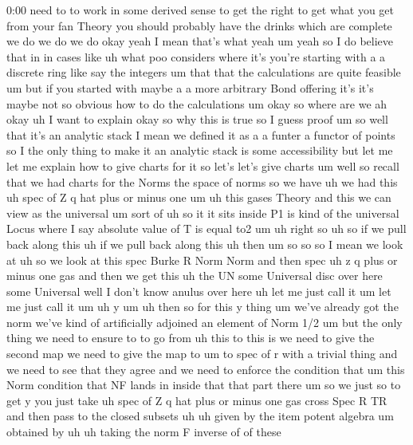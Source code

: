 \begin{unfinished}{0:00}
need  to  to  work  in  some  derived  sense  to
get  the  right  to  get  what  you  get  from
your  fan  Theory  you  should  probably  have
the  drinks  which  are  complete  we  do  we
do  we  do  okay  yeah  I  mean  that's  what
yeah  um
yeah  so  I  do  believe  that  in  in  cases
like  uh  what  poo  considers  where  it's
you're  starting  with  a  a  discrete  ring
like  say  the  integers  um  that  that  the
calculations  are  quite  feasible  um  but
if  you  started  with  maybe  a  a  more
arbitrary  Bond  offering  it's  it's  maybe
not  so  obvious  how  to  do  the
calculations  um
okay  so  where  are  we  ah
okay  uh  I  want  to  explain  okay  so  why
this  is  true  so  I  guess  proof
um  so  well  that  it's  an  analytic  stack  I
mean  we  defined  it  as  a  a  funter  a
functor  of  points  so  I  the  only  thing  to
make  it  an  analytic  stack  is  some
accessibility  but  let  me  let  me  explain
how  to  give  charts  for  it  so  let's  let's
give
charts  um  well  so  recall  that  we  had
charts  for  the  Norms  the  space  of  norms
so  we  have  uh  we  had  this  uh  spec  of  Z  q
hat  plus  or  minus  one
um  uh  this  gases
Theory  and  this  we  can  view  as  the
universal  um  sort  of
uh  so  it  it  sits  inside  P1  is  kind  of
the  universal  Locus  where  I  say  absolute
value  of  T  is  equal
to2  um
uh  right
so
uh  so  if  we  pull  back  along  this  uh  if
we  pull  back  along
this  uh
then  um
so
so  so  I  mean  we  look  at  uh  so  we  look  at
this  spec  Burke
R  Norm  Norm  and  then
spec  uh  z  q  plus  or  minus  one  gas  and
then  we  get  this  uh  the  UN  some
Universal  disc  over  here  some  Universal
well  I  don't  know  anulus  over  here  uh
let  me  just  call  it  um  let  me  just  call
it
um  uh
y
um
uh
then  so  for  this  y  thing  um  we've
already  got  the  norm  we've  kind  of
artificially  adjoined  an  element  of  Norm
1/2  um  but  the  only  thing  we  need  to
ensure  to  to  go  from  uh  this  to  this  is
we  need  to  give  the  second  map  we  need
to  give  the  map  to  um  to  spec  of  r  with
a  trivial  thing  and  we  need  to  see  that
they  agree  and  we  need  to  enforce  the
condition  that  um  this  Norm  condition
that  NF  lands  in  inside  that  that  part
there  um  so  we  just  so  to  get
y  you  just  take  uh  spec  of  Z  q  hat  plus
or  minus  one  gas  cross  Spec  R
TR  and
then  pass  to  the
closed
subsets  uh  uh  given  by  the  item  potent
algebra
um  obtained  by
uh
uh  taking  the  norm  F  inverse  of  of  these

\end{unfinished}
